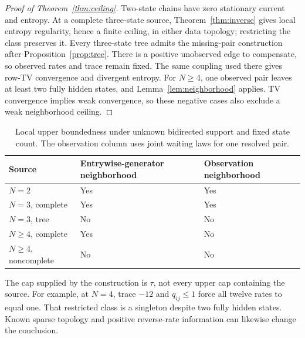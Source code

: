 \documentclass[aps,pre,onecolumn,11pt,longbibliography,notitlepage]{revtex4-2}
\newcommand{\1}{\mathbf 1}
\begin{document}
\begin{proof}[Proof of Theorem~\ref{thm:ceiling}]
Two-state chains have zero stationary current and entropy. At a complete three-state source, Theorem~\ref{thm:inverse} gives local entropy regularity, hence a finite ceiling, in either data topology; restricting the class preserves it. Every three-state tree admits the missing-pair construction after Proposition~\ref{prop:tree}. There is a positive unobserved edge to compensate, so observed rates and trace remain fixed. The same coupling used there gives row-TV convergence and divergent entropy. For $N\ge4$, one observed pair leaves at least two fully hidden states, and Lemma~\ref{lem:neighborhood} applies. TV convergence implies weak convergence, so these negative cases also exclude a weak neighborhood ceiling.
\end{proof}

\begin{table}[t]
\caption{Local upper boundedness under unknown bidirected support and fixed state count. The observation column uses joint waiting laws for one resolved pair.}\label{tab:criterion}
\begin{ruledtabular}
\begin{tabular}{lll}
Source & Entrywise-generator neighborhood & Observation neighborhood\\
\hline
$N=2$ & Yes & Yes\\
$N=3$, complete & Yes & Yes\\
$N=3$, tree & No & No\\
$N\ge4$, complete & Yes & No\\
$N\ge4$, noncomplete & No & No
\end{tabular}
\end{ruledtabular}
\end{table}

The cap supplied by the construction is $\tau$, not every upper cap containing the source. For example, at $N=4$, trace $-12$ and $q_{ij}\le1$ force all twelve rates to equal one. That restricted class is a singleton despite two fully hidden states. Known sparse topology and positive reverse-rate information can likewise change the conclusion.
\end{document}
